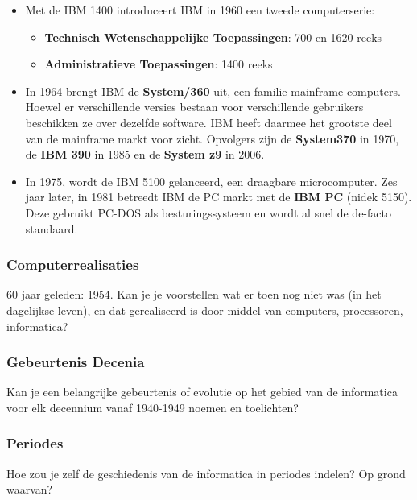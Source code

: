 \documentclass[../main.tex]{subfiles}
\begin{document}
\begin{solution}
\begin{itemize}
	\item Met de IBM 1400 introduceert IBM in 1960 een tweede computerserie:
	\begin{itemize}
		\item \textbf{Technisch Wetenschappelijke Toepassingen}: 700 en 1620 reeks
		\item \textbf{Administratieve Toepassingen}: 1400 reeks
	\end{itemize}
	\item In 1964 brengt IBM de \textbf{System/360} uit, een familie mainframe computers. Hoewel er verschillende versies bestaan voor verschillende gebruikers beschikken ze over dezelfde software. IBM heeft daarmee het grootste deel van de mainframe markt voor zicht. Opvolgers zijn de \textbf{System370} in 1970, de \textbf{IBM 390} in 1985 en de \textbf{System z9} in 2006.
	\item In 1975, wordt de IBM 5100 gelanceerd, een draagbare microcomputer. Zes jaar later, in 1981 betreedt IBM de PC markt met de \textbf{IBM PC} (nidek 5150). Deze gebruikt PC-DOS als besturingssysteem en wordt al snel de de-facto standaard.
\end{itemize}
\end{solution}

\subsubsection{Computerrealisaties}
\begin{question}
60 jaar geleden: 1954. Kan je je voorstellen wat er toen nog niet was (in het dagelijkse leven), en dat gerealiseerd is door middel van computers, processoren, informatica?
\end{question}

\subsubsection{Gebeurtenis Decenia}
\begin{question}
Kan je een belangrijke gebeurtenis of evolutie op het gebied van de informatica voor elk decennium vanaf 1940-1949 noemen en toelichten?
\end{question}

\subsubsection{Periodes}
\begin{question}
Hoe zou je zelf de geschiedenis van de informatica in periodes indelen? Op grond waarvan?
\end{question}
\end{document}
